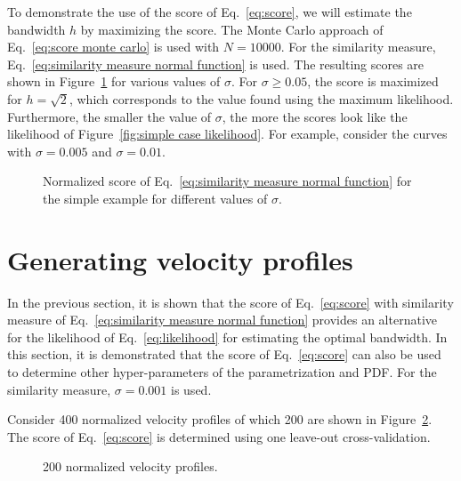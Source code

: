 \documentclass[10pt,final,a4paper,oneside,onecolumn]{article}
\newlength\figurewidth
\newlength\figureheight
\theoremstyle{plain}\newtheorem{definition}{Definition}[section]    %
\theoremstyle{definition}\newtheorem{example}{Example}[section]     %
\theoremstyle{remark}\newtheorem{remarkenv}{Remark}[section]        %
\begin{document}
To demonstrate the use of the score of Eq.~\eqref{eq:score}, we will estimate the bandwidth $h$ by maximizing the score. The Monte Carlo approach of Eq.~\eqref{eq:score monte carlo} is used with $N=10000$. For the similarity measure, Eq.~\eqref{eq:similarity measure normal function} is used. The resulting scores are shown in Figure~\ref{fig:simple case scores} for various values of $\sigma$. For $\sigma \geq 0.05$, the score is maximized for $h=\sqrt{2}$, which corresponds to the value found using the maximum likelihood. Furthermore, the smaller the value of $\sigma$, the more the scores look like the likelihood of Figure~\ref{fig:simple case likelihood}. For example, consider the curves with $\sigma=0.005$ and $\sigma=0.01$.

\begin{figure}
	\centering
	\setlength\figureheight{200pt}
	\setlength\figurewidth{300pt}
	
	\caption{Normalized score of Eq.~\eqref{eq:similarity measure normal function} for the simple example for different values of $\sigma$.}
	\label{fig:simple case scores}
\end{figure}


\section{Generating velocity profiles}
\label{sec:generating profiles}

In the previous section, it is shown that the score of Eq.~\eqref{eq:score} with similarity measure of Eq.~\eqref{eq:similarity measure normal function} provides an alternative for the likelihood of Eq.~\eqref{eq:likelihood} for estimating the optimal bandwidth. In this section, it is demonstrated that the score of Eq.~\eqref{eq:score} can also be used to determine other hyper-parameters of the parametrization and PDF. For the similarity measure, $\sigma=0.001$ is used.

Consider 400 normalized velocity profiles of which 200 are shown in Figure~\ref{fig:velocity profiles}. The score of Eq.~\eqref{eq:score} is determined using one leave-out cross-validation.

\begin{figure}
	\centering
	\setlength\figureheight{200pt}
	\setlength\figurewidth{300pt}
	
	\caption{200 normalized velocity profiles.}
	\label{fig:velocity profiles}
\end{figure}
\end{document}
